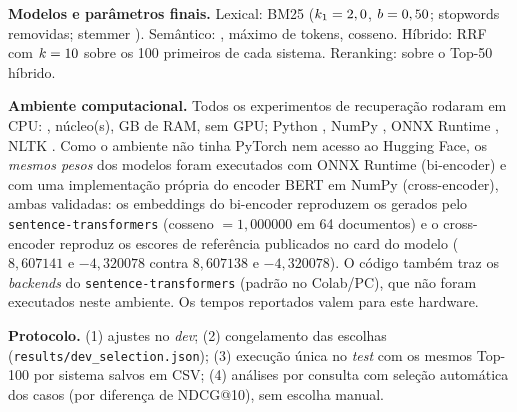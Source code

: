 \textbf{Modelos e parâmetros finais.} Lexical: BM25 ($k_1=2,0$, $b=0,50$; stopwords removidas; stemmer \PreStem). Semântico: \texttt{\EncName}, máximo de \EncMaxLen{} tokens, cosseno. Híbrido: RRF com $k=10$ sobre os 100 primeiros de cada sistema. Reranking: \texttt{\CEName} sobre o Top-50 híbrido.

\textbf{Ambiente computacional.} Todos os experimentos de recuperação rodaram em CPU: \CpuModel, \CpuCores{} núcleo(s), \RamGB{} GB de RAM, sem GPU; Python \PyVer, NumPy \NumpyVer, ONNX Runtime \OrtVer, NLTK \NltkVer. Como o ambiente não tinha PyTorch nem acesso ao Hugging Face, os \emph{mesmos pesos} dos modelos foram executados com ONNX Runtime (bi-encoder) e com uma implementação própria do encoder BERT em NumPy (cross-encoder), ambas validadas: os embeddings do bi-encoder reproduzem os gerados pelo \texttt{sentence-transformers} (cosseno $=1{,}000000$ em 64 documentos) e o cross-encoder reproduz os escores de referência publicados no card do modelo ($8{,}607141$ e $-4{,}320078$ contra $8{,}607138$ e $-4{,}320078$). O código também traz os \emph{backends} do \texttt{sentence-transformers} (padrão no Colab/PC), que não foram executados neste ambiente. Os tempos reportados valem para este hardware.

\textbf{Protocolo.} (1) ajustes no \emph{dev}; (2) congelamento das escolhas (\texttt{results/dev\_selection.json}); (3) execução única no \emph{test} com os mesmos Top-100 por sistema salvos em CSV; (4) análises por consulta com seleção automática dos casos (por diferença de NDCG@10), sem escolha manual.
